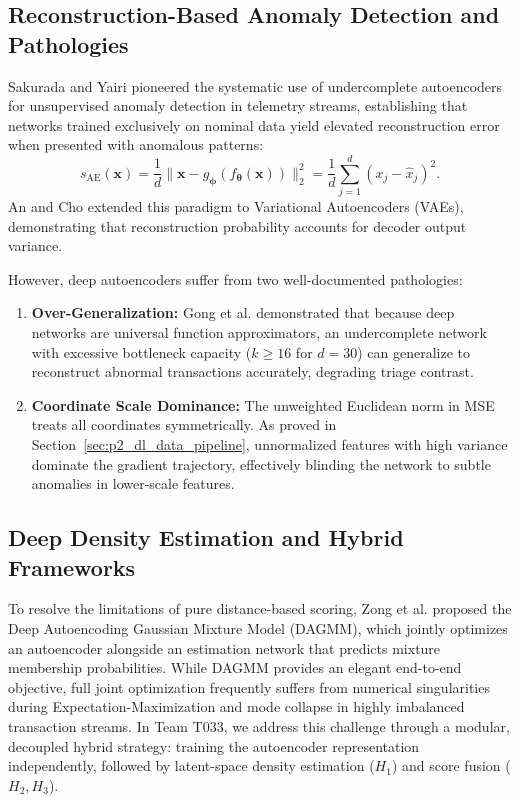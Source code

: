 \subsection{Reconstruction-Based Anomaly Detection and Pathologies}
Sakurada and Yairi \cite{sakurada2014anomaly} pioneered the systematic use of undercomplete autoencoders for unsupervised anomaly detection in telemetry streams, establishing that networks trained exclusively on nominal data yield elevated reconstruction error when presented with anomalous patterns:
\begin{equation}
    s_{\text{AE}}(\mathbf{x}) = \frac{1}{d} \|\mathbf{x} - g_{\boldsymbol{\phi}}(f_{\boldsymbol{\theta}}(\mathbf{x}))\|_2^2 = \frac{1}{d} \sum_{j=1}^d (x_j - \hat{x}_j)^2.
\end{equation}
An and Cho \cite{an2015variational} extended this paradigm to Variational Autoencoders (VAEs), demonstrating that reconstruction probability accounts for decoder output variance.

However, deep autoencoders suffer from two well-documented pathologies:
\begin{enumerate}
    \item \textbf{Over-Generalization:} Gong et al. \cite{gong2019memorizing} demonstrated that because deep networks are universal function approximators, an undercomplete network with excessive bottleneck capacity ($k \ge 16$ for $d=30$) can generalize to reconstruct abnormal transactions accurately, degrading triage contrast.
    \item \textbf{Coordinate Scale Dominance:} The unweighted Euclidean norm in MSE treats all coordinates symmetrically. As proved in Section~\ref{sec:p2_dl_data_pipeline}, unnormalized features with high variance dominate the gradient trajectory, effectively blinding the network to subtle anomalies in lower-scale features.
\end{enumerate}

\subsection{Deep Density Estimation and Hybrid Frameworks}
To resolve the limitations of pure distance-based scoring, Zong et al. \cite{zong2018deep} proposed the Deep Autoencoding Gaussian Mixture Model (DAGMM), which jointly optimizes an autoencoder alongside an estimation network that predicts mixture membership probabilities. While DAGMM provides an elegant end-to-end objective, full joint optimization frequently suffers from numerical singularities during Expectation-Maximization and mode collapse in highly imbalanced transaction streams. In Team T033, we address this challenge through a modular, decoupled hybrid strategy: training the autoencoder representation independently, followed by latent-space density estimation ($H_1$) and score fusion ($H_2, H_3$).

